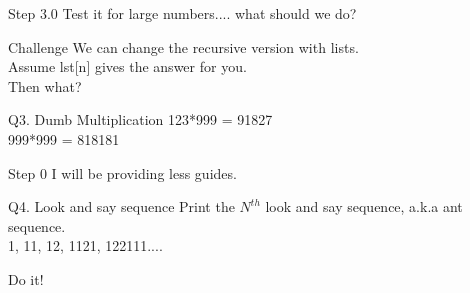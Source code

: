 \documentclass{beamer}
\begin{document}
\begin{frame}{Step 3.0}
  Test it for large numbers.... what should we do?
\end{frame}

\begin{frame}{Challenge}
  We can change the recursive version with lists.\\
  Assume lst[n] gives the answer for you.\\
  Then what?
\end{frame}

\begin{frame}{Q3. Dumb Multiplication}
  123*999 = 91827\\
  999*999 = 818181
\end{frame}

\begin{frame}{Step 0}
  I will be providing less guides.
\end{frame}

\begin{frame}{Q4. Look and say sequence}
  Print the $N^{th}$ look and say sequence,
  a.k.a ant sequence.\\
  1, 11, 12, 1121, 122111....
\end{frame}

\begin{frame}{Do it!}
\end{frame}
\end{document}
